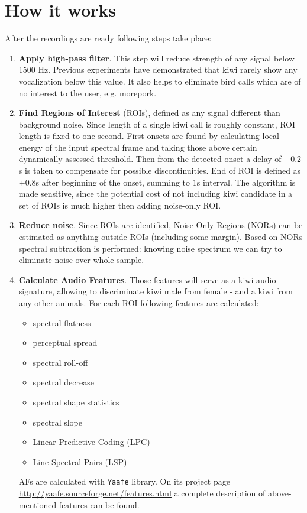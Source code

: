 \documentclass[paper=a4, fontsize=11pt]{scrartcl}	%
\numberwithin{equation}{section}		%
\numberwithin{figure}{section}			%
\numberwithin{table}{section}				%
\begin{document}
\section{How it works}
After the recordings are ready following steps take place:
\begin{enumerate}
	\item \textbf{Apply high-pass filter}. This step will reduce strength of any signal below 1500 Hz. Previous experiments have demonstrated that kiwi rarely show any vocalization below this value. It also helps to eliminate bird calls which are of no interest to the user, e.g. morepork.
	\item \textbf{Find Regions of Interest} (ROIs), defined as any signal different than background noise. Since length of a single kiwi call is roughly constant, ROI length is fixed to one second. First onsets are found by calculating local energy of the input spectral frame and taking those above certain dynamically-assessed threshold. Then from the detected onset a delay of $-0.2$s is taken to compensate for possible discontinuities. End of ROI is defined as $+0.8$s after beginning of the onset, summing to $1$s interval. The algorithm is made sensitive, since the potential cost of not including kiwi candidate in a set of ROIs is much higher then adding noise-only ROI.
	\item \textbf{Reduce noise}. Since ROIs are identified, Noise-Only Regions (NORs) can be estimated as anything outside ROIs (including some margin). Based on NORs spectral subtraction is performed: knowing noise spectrum we can try to eliminate noise over whole sample.
	\item \textbf{Calculate Audio Features}. Those features will serve as a kiwi audio signature, allowing to discriminate kiwi male from female - and a kiwi from any other animals. For each ROI following features are calculated:
	\begin{itemize}
		\item spectral flatness
		\item perceptual spread
		\item spectral roll-off
		\item spectral decrease
		\item spectral shape statistics
		\item spectral slope
		\item Linear Predictive Coding (LPC)
		\item Line Spectral Pairs (LSP)
	\end{itemize}
	AFs are calculated with \texttt{Yaafe} library. On its project page \url{http://yaafe.sourceforge.net/features.html} a complete description of above-mentioned features can be found.

\end{enumerate}
\end{document}
